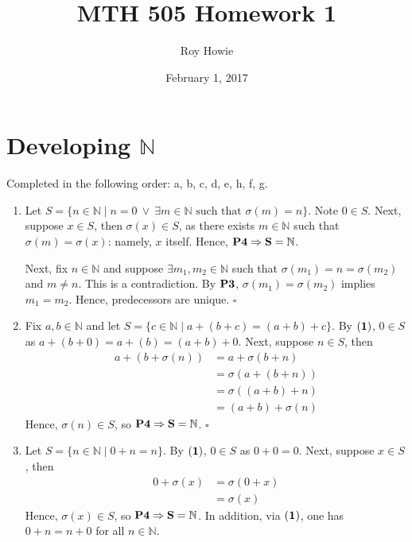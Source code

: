 \documentclass{article}
\newcommand{\N}{\mathbb{N}}
\begin{document}
\title{MTH 505 Homework 1}
\author{Roy Howie}
\date{February 1, 2017}
\maketitle

\section{Developing $\N$}
  Completed in the following order: a, b, c, d, e, h, f, g.
  \begin{enumerate}[label=\textbf{(\alph*)}]
    \item{
      Let $S=\{n\in\N\mid n=0 \ \vee \ \exists m\in\N\text{ such that }\sigma(m)
      =n\}$. Note $0\in S$. Next, suppose $x\in S$, then $\sigma(x)\in S$, as
      there exists $m \in \N$ such that $\sigma(m)=\sigma(x)$: namely, $x$
      itself. Hence, $\bf{P4}\Rightarrow S=\N$.

      Next, fix $n\in\N$ and suppose $\exists m_1,m_2\in\N$ such that
      $\sigma(m_1)=n=\sigma(m_2)$ and $m\ne n$. This is a contradiction. By
      $\bf{P3}$, $\sigma(m_1)=\sigma(m_2)$ implies $m_1=m_2$. Hence,
      predecessors are unique.
      \hfill $\square$
    }
    \item{
      Fix $a,b\in\N$ and let $S=\{c\in\N\mid a+(b+c)=(a+b)+c\}$. By $\bf{(1)}$,
      $0\in S$ as $a+(b+0)=a+(b)=(a+b)+0$. Next, suppose $n \in S$, then
      \begin{align*}
        a+(b+\sigma(n)) &= a+\sigma(b+n)    \tag{2} \\
                        &= \sigma(a+(b+n))  \tag{2} \\
                        &= \sigma((a+b)+n)  \tag{IH}\\
                        &= (a+b)+\sigma(n)  \tag{2}
      \end{align*}
      Hence, $\sigma(n) \in S$, so $\bf{P4}\Rightarrow S = \N$.
      \hfill $\square$
    }
    \item{
      Let $S=\{n\in\N\mid0+n=n\}$. By $\bf{(1)}$, $0\in S$ as $0+0=0$. Next,
      suppose $x\in S$, then
      \begin{align*}
        0 + \sigma(x) &= \sigma(0+x)  \tag{2} \\
                      &= \sigma(x)    \tag{IH}
      \end{align*}
      Hence, $\sigma(x) \in S$, so $\bf{P4}\Rightarrow S=\N$. In addition, via
      $\bf{(1)}$, one has $0+n=n+0$ for all $n\in\N$.

}
\end{enumerate}
\end{document}
